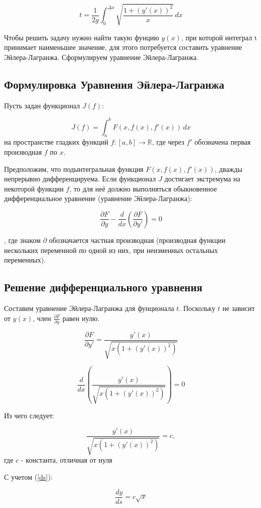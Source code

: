 \documentclass[a4paper, 12pt]{article}
\begin{document}
\begin{equation}
    t = \frac{1}{2g} \int_{0}^{\Delta x} \sqrt{\frac{1+(y'(x))^2}{x}} \,dx
\end{equation}

Чтобы решить задачу нужно найти такую фунцию $y(x)$, при которой интеграл t принимает наименьшее значение, для этого потребуется составить уравнение Эйлера-Лагранжа. Сформулируем уравнение Эйлера-Лагранжа.
\subsection{Формулировка Уравнения Эйлера-Лагранжа}
Пусть задан функционал $J(f)$:

\[ J(f) = \int_{a}^{b} F(x, f(x), f'(x)) \,dx\]
на пространстве гладких функций $f:[a,b] \rightarrow \mathbb{R}$, где через $f'$ обозначена первая производная $f$ по $x$.

Предположим, что подынтегральная функция $F(x, f(x), f'(x))$, дважды непрерывно дифференцируема.
Если функционал $J$ достигает экстремума на некоторой функции $f$, то для неё должно выполняться обыкновенное дифференциальное уравнение (уравнение Эйлера-Лагранжа):

\[ \frac{\partial F}{\partial y} - \frac{d}{dx} \left( \frac{\partial F}{\partial y'} \right) = 0 \]

, где знаком $\partial$ обозначается частная производная (производная функции нескольких переменной по одной из них, при неизменных остальных переменных).
\subsection{Решение дифференциального уравнения}
Составим уравнение Эйлера-Лагранжа для фунционала $t$. Поскольку $t$ не зависит от $y(x)$, член $\frac{\partial F}{\partial y}$ равен нулю.


\[ \frac{\partial F}{\partial y'} = \frac{y'(x)}{\sqrt{x(1+(y'(x))^2)}} \]

\[ \frac{d}{dx} \left( \frac{y'(x)}{\sqrt{x(1+(y'(x))^2)}} \right) = 0 \]

Из чего следует:

\[ \frac{y'(x)}{\sqrt{x(1+(y'(x))^2)}} = c, \]
где $c$ - константа, отличная от нуля

С учетом (\ref{ds}):

\begin{equation}
    \frac{dy}{ds} = c\sqrt{x}
    \label{dy/ds}
\end{equation}
\end{document}
